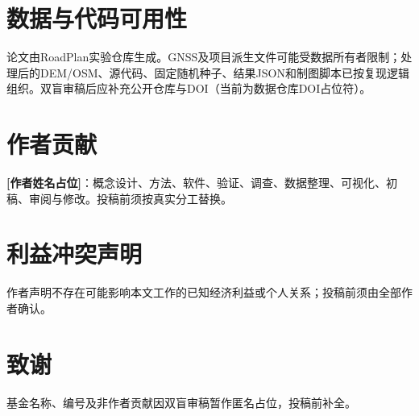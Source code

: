 \documentclass[preprint,12pt]{elsarticle}
\begin{document}
\section*{数据与代码可用性}
论文由RoadPlan实验仓库生成。GNSS及项目派生文件可能受数据所有者限制；处理后的DEM/OSM、源代码、固定随机种子、结果JSON和制图脚本已按复现逻辑组织。双盲审稿后应补充公开仓库与DOI（当前为数据仓库DOI占位符）。

\section*{作者贡献}
\textbf{[作者姓名占位]}：概念设计、方法、软件、验证、调查、数据整理、可视化、初稿、审阅与修改。投稿前须按真实分工替换。

\section*{利益冲突声明}
作者声明不存在可能影响本文工作的已知经济利益或个人关系；投稿前须由全部作者确认。

\section*{致谢}
基金名称、编号及非作者贡献因双盲审稿暂作匿名占位，投稿前补全。



\end{document}

